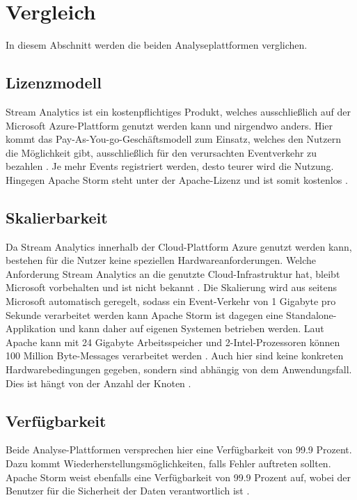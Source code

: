 \section{Vergleich}

In diesem Abschnitt werden die beiden Analyseplattformen verglichen. 


\subsection{Lizenzmodell}
Stream Analytics ist ein kostenpflichtiges Produkt, welches ausschließlich auf der Microsoft Azure-Plattform genutzt werden kann und nirgendwo anders. Hier kommt das Pay-As-You-go-Geschäftsmodell zum Einsatz, welches den Nutzern die Möglichkeit gibt, ausschließlich für den verursachten Eventverkehr zu bezahlen \cite{Pricing.2017}. Je mehr Events registriert werden, desto teurer wird die Nutzung. Hingegen Apache Storm steht unter der Apache-Lizenz und ist somit kostenlos \cite{lizenz.2004}. 

\subsection{Skalierbarkeit}
Da Stream Analytics innerhalb der Cloud-Plattform Azure genutzt werden kann, bestehen für die Nutzer keine speziellen Hardwareanforderungen. Welche Anforderung Stream Analytics an die genutzte Cloud-Infrastruktur hat, bleibt Microsoft vorbehalten und ist nicht bekannt \cite{samacha.2017}. Die Skalierung wird aus seitens Microsoft automatisch geregelt, sodass ein Event-Verkehr von 1 Gigabyte pro Sekunde verarbeitet werden kann \cite{samacha.19.12.2017b} Apache Storm ist dagegen eine Standalone-Applikation und kann daher auf eigenen Systemen betrieben werden. Laut Apache kann mit 24 Gigabyte Arbeitsspeicher und 2-Intel-Prozessoren können 100 Million Byte-Messages verarbeitet werden \cite{apachescale.2017}. Auch hier sind keine konkreten Hardwarebedingungen gegeben, sondern sind abhängig von dem Anwendungsfall. Dies ist hängt von der Anzahl der Knoten \cite{samacha.2017}.


\subsection{Verfügbarkeit}
Beide Analyse-Plattformen versprechen hier eine Verfügbarkeit von 99.9 Prozent. Dazu kommt Wiederherstellungsmöglichkeiten, falls Fehler auftreten sollten. Apache Storm weist ebenfalls eine Verfügbarkeit von 99.9 Prozent auf, wobei der Benutzer für die Sicherheit der Daten verantwortlich ist \cite{samacha.2017}. 

